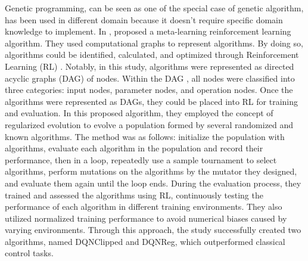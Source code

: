 \begin{ZhChapter}
    Genetic programming, can be seen as one of the special case of genetic algorithm, has been used in different domain because it doesn't require specific domain knowledge to implement. In \cite{coreyes2022evolvingreinforcementlearningalgorithms}, \citeauthor{coreyes2022evolvingreinforcementlearningalgorithms} proposed a meta-learning reinforcement learning algorithm. They used computational graphs to represent algorithms. By doing so, algorithms could be identified, calculated, and optimized through Reinforcement Learning (RL) \cite{kaelbling1996reinforcement}. Notably, in this study, algorithms were represented as directed acyclic graphs (DAG) \cite{thost2021directedacyclicgraphneural} of nodes. Within the DAG , all nodes were classified into three categories: input nodes, parameter nodes, and operation nodes. Once the algorithms were represented as DAGs, they could be placed into RL for training and evaluation. In this proposed algorithm, they employed the concept of regularized evolution \cite{real2019regularized} to evolve a population formed by several randomized and known algorithms. The method was as follows: initialize the population with algorithms, evaluate each algorithm in the population and record their performance, then in a loop, repeatedly use a sample tournament \cite{goldberg1991comparative} to select algorithms, perform mutations on the algorithms by the mutator they designed, and evaluate them again until the loop ends. During the evaluation process, they trained and assessed the algorithms using RL, continuously testing the performance of each algorithm in different training environments. They also utilized normalized training performance to avoid numerical biases caused by varying environments. Through this approach, the study successfully created two algorithms, named DQNClipped and DQNReg, which outperformed classical control tasks.


\end{ZhChapter}
